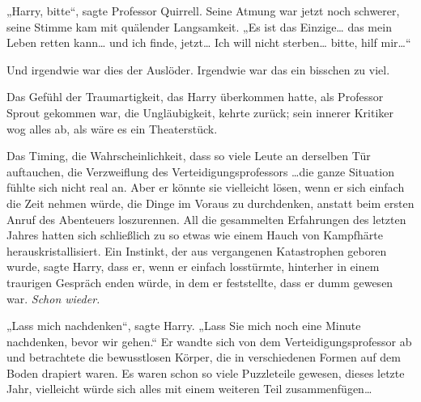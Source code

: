 „Harry, bitte“, sagte Professor Quirrell.
Seine Atmung war jetzt noch schwerer, seine Stimme kam mit quälender Langsamkeit.
„Es ist das Einzige… das mein Leben retten kann… und ich finde, jetzt… Ich will nicht sterben… bitte, hilf mir…“

Und irgendwie war dies der Auslöder. Irgendwie war das ein bisschen zu viel.

Das Gefühl der Traumartigkeit, das Harry überkommen hatte, als Professor Sprout gekommen war, die Ungläubigkeit, kehrte zurück; sein innerer Kritiker wog alles ab, als wäre es ein Theaterstück.

Das Timing, die Wahrscheinlichkeit, dass so viele Leute an derselben Tür auftauchen, die Verzweiflung des Verteidigungsprofessors
…die ganze Situation fühlte sich nicht real an. Aber er könnte sie vielleicht lösen, wenn er sich einfach die Zeit nehmen würde, die Dinge im Voraus zu durchdenken, anstatt beim ersten Anruf des Abenteuers loszurennen. All die gesammelten Erfahrungen des letzten Jahres hatten sich schließlich zu so etwas wie einem Hauch von Kampfhärte herauskristallisiert. Ein Instinkt, der aus vergangenen Katastrophen geboren wurde, sagte Harry, dass er, wenn er einfach losstürmte, hinterher in einem traurigen Gespräch enden würde, in dem er feststellte, dass er dumm gewesen war. \emph{Schon wieder.}

„Lass mich nachdenken“, sagte Harry. „Lass Sie mich noch eine Minute nachdenken, bevor wir gehen.“
Er wandte sich von dem Verteidigungsprofessor ab und betrachtete die bewusstlosen Körper, die in verschiedenen Formen auf dem Boden drapiert waren. Es waren schon so viele Puzzleteile gewesen, dieses letzte Jahr, vielleicht würde sich alles mit einem weiteren Teil zusammenfügen…

